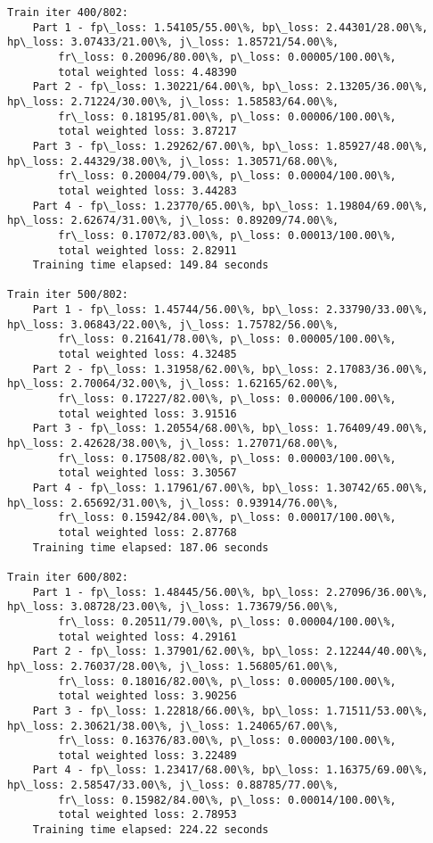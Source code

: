 \documentclass[11pt]{article}
\begin{document}
\begin{Verbatim}[commandchars=\\\{\}]
Train iter 400/802:
	Part 1 - fp\_loss: 1.54105/55.00\%, bp\_loss: 2.44301/28.00\%, hp\_loss: 3.07433/21.00\%, j\_loss: 1.85721/54.00\%, 
		fr\_loss: 0.20096/80.00\%, p\_loss: 0.00005/100.00\%, 
		total weighted loss: 4.48390
	Part 2 - fp\_loss: 1.30221/64.00\%, bp\_loss: 2.13205/36.00\%, hp\_loss: 2.71224/30.00\%, j\_loss: 1.58583/64.00\%, 
		fr\_loss: 0.18195/81.00\%, p\_loss: 0.00006/100.00\%, 
		total weighted loss: 3.87217
	Part 3 - fp\_loss: 1.29262/67.00\%, bp\_loss: 1.85927/48.00\%, hp\_loss: 2.44329/38.00\%, j\_loss: 1.30571/68.00\%, 
		fr\_loss: 0.20004/79.00\%, p\_loss: 0.00004/100.00\%, 
		total weighted loss: 3.44283
	Part 4 - fp\_loss: 1.23770/65.00\%, bp\_loss: 1.19804/69.00\%, hp\_loss: 2.62674/31.00\%, j\_loss: 0.89209/74.00\%, 
		fr\_loss: 0.17072/83.00\%, p\_loss: 0.00013/100.00\%, 
		total weighted loss: 2.82911
	Training time elapsed: 149.84 seconds

Train iter 500/802:
	Part 1 - fp\_loss: 1.45744/56.00\%, bp\_loss: 2.33790/33.00\%, hp\_loss: 3.06843/22.00\%, j\_loss: 1.75782/56.00\%, 
		fr\_loss: 0.21641/78.00\%, p\_loss: 0.00005/100.00\%, 
		total weighted loss: 4.32485
	Part 2 - fp\_loss: 1.31958/62.00\%, bp\_loss: 2.17083/36.00\%, hp\_loss: 2.70064/32.00\%, j\_loss: 1.62165/62.00\%, 
		fr\_loss: 0.17227/82.00\%, p\_loss: 0.00006/100.00\%, 
		total weighted loss: 3.91516
	Part 3 - fp\_loss: 1.20554/68.00\%, bp\_loss: 1.76409/49.00\%, hp\_loss: 2.42628/38.00\%, j\_loss: 1.27071/68.00\%, 
		fr\_loss: 0.17508/82.00\%, p\_loss: 0.00003/100.00\%, 
		total weighted loss: 3.30567
	Part 4 - fp\_loss: 1.17961/67.00\%, bp\_loss: 1.30742/65.00\%, hp\_loss: 2.65692/31.00\%, j\_loss: 0.93914/76.00\%, 
		fr\_loss: 0.15942/84.00\%, p\_loss: 0.00017/100.00\%, 
		total weighted loss: 2.87768
	Training time elapsed: 187.06 seconds

Train iter 600/802:
	Part 1 - fp\_loss: 1.48445/56.00\%, bp\_loss: 2.27096/36.00\%, hp\_loss: 3.08728/23.00\%, j\_loss: 1.73679/56.00\%, 
		fr\_loss: 0.20511/79.00\%, p\_loss: 0.00004/100.00\%, 
		total weighted loss: 4.29161
	Part 2 - fp\_loss: 1.37901/62.00\%, bp\_loss: 2.12244/40.00\%, hp\_loss: 2.76037/28.00\%, j\_loss: 1.56805/61.00\%, 
		fr\_loss: 0.18016/82.00\%, p\_loss: 0.00005/100.00\%, 
		total weighted loss: 3.90256
	Part 3 - fp\_loss: 1.22818/66.00\%, bp\_loss: 1.71511/53.00\%, hp\_loss: 2.30621/38.00\%, j\_loss: 1.24065/67.00\%, 
		fr\_loss: 0.16376/83.00\%, p\_loss: 0.00003/100.00\%, 
		total weighted loss: 3.22489
	Part 4 - fp\_loss: 1.23417/68.00\%, bp\_loss: 1.16375/69.00\%, hp\_loss: 2.58547/33.00\%, j\_loss: 0.88785/77.00\%, 
		fr\_loss: 0.15982/84.00\%, p\_loss: 0.00014/100.00\%, 
		total weighted loss: 2.78953
	Training time elapsed: 224.22 seconds


\end{Verbatim}
\end{document}
